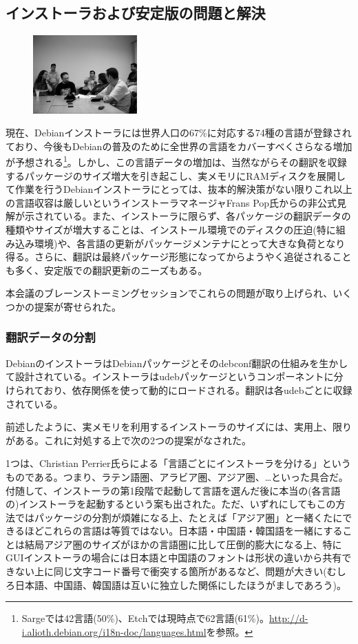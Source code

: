 \documentclass[mingoth,a4paper]{jsarticle}
\begin{document}
\subsection{インストーラおよび安定版の問題と解決}
\label{sec:extremadura-installer}

\begin{figure}\includegraphics[width=4cm]{image200610/d-i.eps}\end{figure}

現在、Debianインストーラには世界人口の67\%に対応する74種の言語が登録されており、今後もDebianの普及のために全世界の言語をカバーすべくさらなる増加が予想される\footnote{Sargeでは42言語(50\%)、Etchでは現時点で62言語(61\%)。\url{http://d-i.alioth.debian.org/i18n-doc/languages.html}を参照。}。しかし、この言語データの増加は、当然ながらその翻訳を収録するパッケージのサイズ増大を引き起こし、実メモリにRAMディスクを展開して作業を行うDebianインストーラにとっては、抜本的解決策がない限りこれ以上の言語収容は厳しいというインストーラマネージャFrans Pop氏からの非公式見解が示されている。また、インストーラに限らず、各パッケージの翻訳データの種類やサイズが増大することは、インストール環境でのディスクの圧迫(特に組み込み環境)や、各言語の更新がパッケージメンテナにとって大きな負荷となり得る。さらに、翻訳は最終パッケージ形態になってからようやく追従されることも多く、安定版での翻訳更新のニーズもある。


本会議のブレーンストーミングセッションでこれらの問題が取り上げられ、いくつかの提案が寄せられた。

\subsubsection{翻訳データの分割}
\label{sec:extremadura-shrink}

DebianのインストーラはDebianパッケージとそのdebconf翻訳の仕組みを生かして設計されている。インストーラはudebパッケージというコンポーネントに分けられており、依存関係を使って動的にロードされる。翻訳は各udebごとに収録されている。

前述したように、実メモリを利用するインストーラのサイズには、実用上、限りがある。これに対処する上で次の2つの提案がなされた。

1つは、Christian Perrier氏らによる「言語ごとにインストーラを分ける」というものである。つまり、ラテン語圏、アラビア圏、アジア圏、…といった具合だ。付随して、インストーラの第1段階で起動して言語を選んだ後に本当の(各言語の)インストーラを起動するという案も出された。ただ、いずれにしてもこの方法ではパッケージの分割が煩雑になる上、たとえば「アジア圏」と一緒くたにできるほどこれらの言語は等質ではない。日本語・中国語・韓国語を一緒にすることは結局アジア圏のサイズがほかの言語圏に比して圧倒的膨大になる上、特にGUIインストーラの場合には日本語と中国語のフォントは形状の違いから共有できない上に同じ文字コード番号で衝突する箇所があるなど、問題が大きい(むしろ日本語、中国語、韓国語は互いに独立した関係にしたほうがましであろう)。
\end{document}
